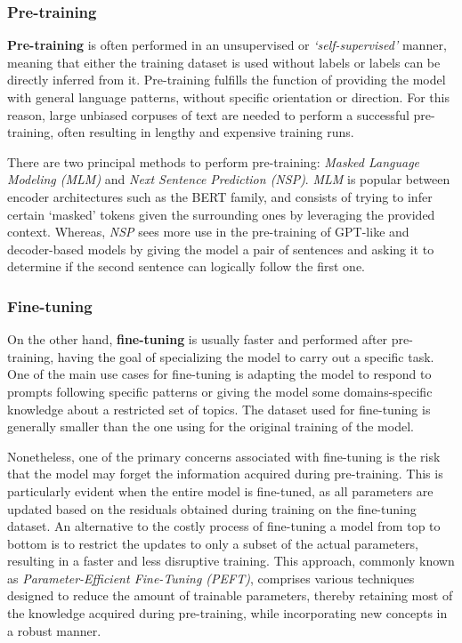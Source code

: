 \subsubsection*{Pre-training}

\textbf{Pre-training} is often performed in an unsupervised or \emph{`self-supervised'} manner, meaning that either the training dataset is used without labels or labels can be directly inferred from it.
Pre-training fulfills the function of providing the model with general language patterns, without specific orientation or direction.
For this reason, large unbiased corpuses of text are needed to perform a successful pre-training, often resulting in lengthy and expensive training runs.

There are two principal methods to perform pre-training: \emph{Masked Language Modeling (MLM)} and \emph{Next Sentence Prediction (NSP)}.
\emph{MLM} is popular between encoder architectures such as the BERT family, and consists of trying to infer certain `masked' tokens given the surrounding ones by leveraging the provided context.
Whereas, \emph{NSP} sees more use in the pre-training of GPT-like and decoder-based models by giving the model a pair of sentences and asking it to determine if the second sentence can logically follow the first one.

\subsubsection*{Fine-tuning}

On the other hand, \textbf{fine-tuning} is usually faster and performed after pre-training, having the goal of specializing the model to carry out a specific task.
One of the main use cases for fine-tuning is adapting the model to respond to prompts following specific patterns or giving the model some domains-specific knowledge about a restricted set of topics.
The dataset used for fine-tuning is generally smaller than the one using for the original training of the model.

Nonetheless, one of the primary concerns associated with fine-tuning is the risk that the model may forget the information acquired during pre-training.
This is particularly evident when the entire model is fine-tuned, as all parameters are updated based on the residuals obtained during training on the fine-tuning dataset.
An alternative to the costly process of fine-tuning a model from top to bottom is to restrict the updates to only a subset of the actual parameters, resulting in a faster and less disruptive training.
This approach, commonly known as \emph{Parameter-Efficient Fine-Tuning (PEFT)}, comprises various techniques designed to reduce the amount of trainable parameters, thereby retaining most of the knowledge acquired during pre-training, while incorporating new concepts in a robust manner.
